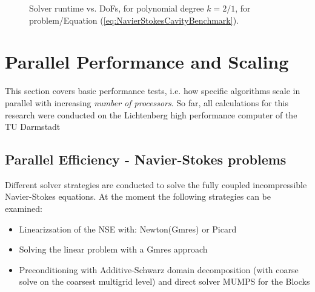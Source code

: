 \documentclass[a4paper,10pt]{report} %
\begin{document}
\graphicspath{{./apdx-NodeSolverPerformance/NavierStokesDrivenCavity/plots/}}

\begin{figure}[h!]
	\begin{center}
		
	\end{center}
	\caption{
		Solver runtime vs. DoFs, for polynomial degree $k=2/1$,
		for problem/Equation (\ref{eq:NavierStokesCavityBenchmark}).
	}
	\label{fig:DrivenCavity}
\end{figure}


\chapter{Parallel Performance and Scaling}
\label{sec:ParallelPerformance}
This section covers basic performance tests, i.e. how specific algorithms scale in parallel with increasing \emph{number of processors}. So far, all calculations for this research were conducted on the Lichtenberg high performance computer of the TU Darmstadt

\section{Parallel Efficiency - Navier-Stokes problems}
Different solver strategies are conducted to solve the fully coupled incompressible Navier-Stokes equations. At the moment the following strategies can be examined:
\begin{itemize}
	\item Linearizsation of the NSE with: Newton(Gmres) or Picard
	\item Solving the linear problem with a Gmres approach
	\item Preconditioning with Additive-Schwarz domain decomposition (with coarse solve on the coarsest multigrid level) and direct solver MUMPS for the Blocks
\end{itemize}
\end{document}
